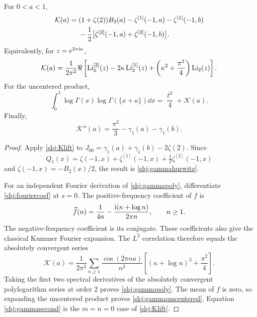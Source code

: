 \begin{theorem}\label{shj:gammathm}
For $0<a<1$,
\begin{align}
\mathcal K(a)={}&(1+\zeta(2))B_2(a)
-\zeta^{[1]}(-1,a)-\zeta^{[1]}(-1,b)\notag\\
&-\frac12\big[\zeta^{[2]}(-1,a)+\zeta^{[2]}(-1,b)\big].
\label{shj:gammahurwitz}
\end{align}
Equivalently, for $z=e^{2\pi\mathrm{i} a}$,
\begin{equation}\label{shj:gammapoly}
\mathcal K(a)=\frac1{2\pi^2}\Re\left[
\operatorname{Li}_2^{[2]}(z)-2\kappa\operatorname{Li}_2^{[1]}(z)
+\left(\kappa^2+\frac{\pi^2}{4}\right)\operatorname{Li}_2(z)\right].
\end{equation}
For the uncentered product,
\begin{equation}\label{shj:gammauncentered}
\int_0^1\log\Gamma(x)\log\Gamma(\{x+a\})\dd x
=\frac{\ell^2}{4}+\mathcal K(a).
\end{equation}
Finally,
\begin{equation}\label{shj:gammasecond}
\mathcal K''(a)=\frac{\pi^2}{3}-\gamma_1(a)-\gamma_1(b).
\end{equation}
\end{theorem}
\begin{proof}
Apply \eqref{shj:Klift} to $J_{00}=\gamma_1(a)+\gamma_1(b)-2\zeta(2)$. Since
\[
Q_1(x)=\zeta(-1,x)+\zeta^{[1]}(-1,x)+\tfrac12\zeta^{[2]}(-1,x)
\]
and $\zeta(-1,x)=-B_2(x)/2$, the result is \eqref{shj:gammahurwitz}.

For an independent Fourier derivation of \eqref{shj:gammapoly}, differentiate \eqref{shj:fouriercoef} at $s=0$. The positive-frequency coefficient of $f$ is
\[
\widehat f(n)=\frac1{4n}-\frac{\mathrm{i}(\kappa+\log n)}{2\pi n},\qquad n\ge1.
\]
The negative-frequency coefficient is its conjugate. These coefficients also give the classical Kummer Fourier expansion. The $L^2$ correlation therefore equals the absolutely convergent series
\begin{equation}\label{shj:gammafourier}
\mathcal K(a)=\frac1{2\pi^2}\sum_{n\ge1}
\frac{\cos(2\pi na)}{n^2}
\left[(\kappa+\log n)^2+\frac{\pi^2}{4}\right].
\end{equation}
Taking the first two spectral derivatives of the absolutely convergent polylogarithm series at order $2$ proves \eqref{shj:gammapoly}. The mean of $f$ is zero, so expanding the uncentered product proves \eqref{shj:gammauncentered}. Equation \eqref{shj:gammasecond} is the $m=n=0$ case of \eqref{shj:Klift}.
\end{proof}

